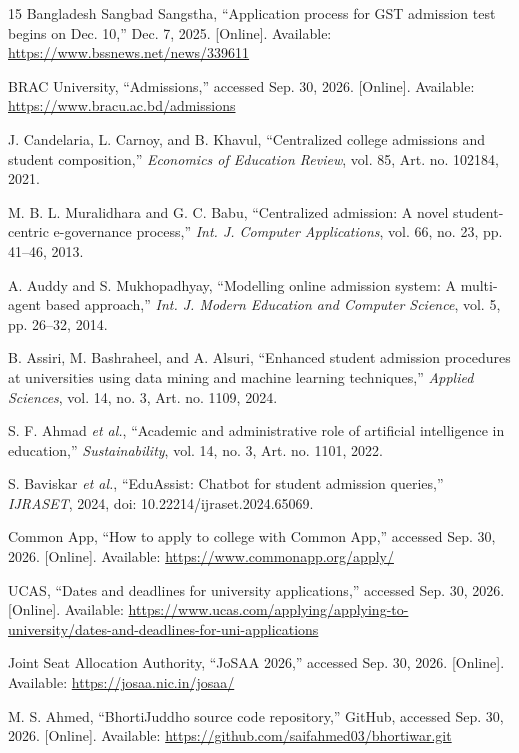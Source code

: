 \documentclass[conference,letterpaper]{IEEEtran}
\begin{document}
\balance
\begin{thebibliography}{15}
Bangladesh Sangbad Sangstha, “Application process for GST admission test begins on Dec. 10,” Dec. 7, 2025. [Online]. Available: \url{https://www.bssnews.net/news/339611}

BRAC University, “Admissions,” accessed Sep. 30, 2026. [Online]. Available: \url{https://www.bracu.ac.bd/admissions}

J. Candelaria, L. Carnoy, and B. Khavul, “Centralized college admissions and student composition,” \emph{Economics of Education Review}, vol. 85, Art. no. 102184, 2021.

M. B. L. Muralidhara and G. C. Babu, “Centralized admission: A novel student-centric e-governance process,” \emph{Int. J. Computer Applications}, vol. 66, no. 23, pp. 41--46, 2013.

A. Auddy and S. Mukhopadhyay, “Modelling online admission system: A multi-agent based approach,” \emph{Int. J. Modern Education and Computer Science}, vol. 5, pp. 26--32, 2014.

B. Assiri, M. Bashraheel, and A. Alsuri, “Enhanced student admission procedures at universities using data mining and machine learning techniques,” \emph{Applied Sciences}, vol. 14, no. 3, Art. no. 1109, 2024.

S. F. Ahmad \emph{et al.}, “Academic and administrative role of artificial intelligence in education,” \emph{Sustainability}, vol. 14, no. 3, Art. no. 1101, 2022.

S. Baviskar \emph{et al.}, “EduAssist: Chatbot for student admission queries,” \emph{IJRASET}, 2024, doi: 10.22214/ijraset.2024.65069.

Common App, “How to apply to college with Common App,” accessed Sep. 30, 2026. [Online]. Available: \url{https://www.commonapp.org/apply/}

UCAS, “Dates and deadlines for university applications,” accessed Sep. 30, 2026. [Online]. Available: \url{https://www.ucas.com/applying/applying-to-university/dates-and-deadlines-for-uni-applications}

Joint Seat Allocation Authority, “JoSAA 2026,” accessed Sep. 30, 2026. [Online]. Available: \url{https://josaa.nic.in/josaa/}

M. S. Ahmed, “BhortiJuddho source code repository,” GitHub, accessed Sep. 30, 2026. [Online]. Available: \url{https://github.com/saifahmed03/bhortiwar.git}


\end{thebibliography}
\end{document}

